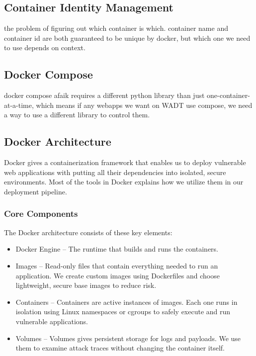 \documentclass[12pt]{article}
\begin{document}
\subsection{Container Identity Management}
the problem of figuring out which container is which. container name and container id are both guaranteed to be unique by docker, but which one we need to use depends on context.

\subsection{Docker Compose}
docker compose afaik requires a different python library than just
one-container-at-a-time, which means if any webapps we want on WADT
use compose, we need a way to use a different library to control them.

\subsection{Docker Architecture}
Docker gives a containerization framework that enables us to deploy vulnerable web applications with putting all their dependencies into isolated, secure environments. Most of the tools in Docker explains how we utilize them in our deployment pipeline.

\subsubsection{Core Components}
The Docker architecture consists of these key elements:
  \begin{itemize}
    \item {Docker Engine} – The runtime that builds and runs the containers.
    \item {Images} – Read-only files that contain everything needed to run an application. We create custom images using Dockerfiles and choose lightweight, secure base images to reduce risk.
    \item {Containers} – Containers are active instances of images. Each one runs in isolation using Linux namespaces or cgroups to safely execute and run vulnerable applications.
    \item {Volumes} – Volumes gives persistent storage for logs and payloads. We use them to examine attack traces without changing the container itself.
    \end{itemize}
\end{document}
